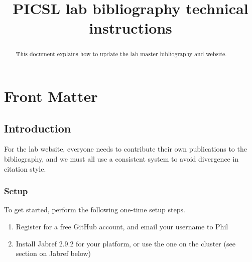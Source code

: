 \documentclass{InsightArticle}
\title{PICSL lab bibliography technical instructions}
\begin{document}
%
% 


\ifpdf
\else
\fi


\maketitle


\ifhtml
\chapter*{Front Matter\label{front}}
\fi



\begin{abstract}
\noindent This document explains how to update the lab master bibliography and website.
\end{abstract}

\tableofcontents
\newpage

\section{Introduction}

For the lab website, everyone needs to contribute their own publications to the bibliography, and we must all use a consistent system to avoid divergence in citation style.

\subsection{Setup}

To get started, perform the following one-time setup steps.

\begin{enumerate}
\item Register for a free GitHub account, and email your username to Phil
\item Install Jabref 2.9.2 for your platform, or use the one on the cluster (see section on Jabref below)
\end{enumerate}
\end{document}
